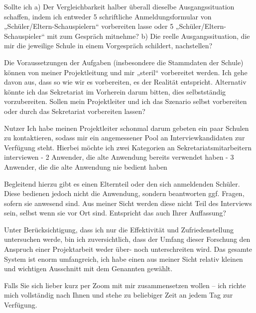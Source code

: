 Sollte ich 
a)	Der Vergleichbarkeit halber überall dieselbe Ausgangssituation schaffen, indem ich entweder 5 schriftliche Anmeldungsformular von „Schüler/Eltern-Schauspielern“ vorbereiten lasse oder 5 „Schüler/Eltern-Schauspieler“ mit zum Gespräch mitnehme?
b)	Die reelle Ausgangssituation, die mir die jeweilige Schule in einem Vorgespräch schildert, nachstellen?

Die Voraussetzungen der Aufgaben (insbesondere die Stammdaten der Schule) können von meiner Projektleitung und mir „steril“ vorbereitet werden.
Ich gehe davon aus, dass so wie wir es vorbereiten, es der Realität entspricht. Alternativ könnte ich das Sekretariat im Vorherein darum bitten, dies selbstständig vorzubereiten.
Sollen mein Projektleiter und ich das Szenario selbst vorbereiten oder durch das Sekretariat vorbereiten lassen?

Nutzer
Ich habe meinen Projektleiter schonmal darum gebeten ein paar Schulen zu kontaktieren, sodass mir ein angemessener Pool an Interviewkandidaten zur Verfügung steht.
Hierbei möchte ich zwei Kategorien an Sekretariatsmitarbeitern interviewen
-	2 Anwender, die alte Anwendung bereits verwendet haben 
-	3 Anwender, die die alte Anwendung nie bedient haben 

Begleitend hierzu gibt es einen Elternteil oder den sich anmeldenden Schüler. Diese bedienen jedoch nicht die Anwendung, sondern beantworten ggf. Fragen, sofern sie anwesend sind.
Aus meiner Sicht werden diese nicht Teil des Interviews sein, selbst wenn sie vor Ort sind. Entspricht das auch Ihrer Auffassung?

Unter Berücksichtigung, dass ich nur die Effektivität und Zufriedenstellung untersuchen werde, bin ich zuversichtlich, dass der Umfang dieser Forschung den Anspruch einer Projektarbeit weder über- noch unterschreiten wird.
Das gesamte System ist enorm umfangreich, ich habe einen aus meiner Sicht relativ kleinen und wichtigen Ausschnitt mit dem Genannten gewählt.

Falls Sie sich lieber kurz per Zoom mit mir zusammensetzen wollen – ich richte mich vollständig nach Ihnen und stehe zu beliebiger Zeit an jedem Tag zur Verfügung.

